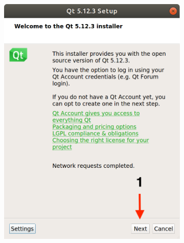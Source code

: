 \begin{figure}[H]
    \centering
    \begin{subfigure}{0.32\linewidth}
        \includegraphics[width=1\textwidth]{images/Qt1.png}
    \end{subfigure}
    \begin{subfigure}{0.32\linewidth}

\end{subfigure}
\end{figure}
